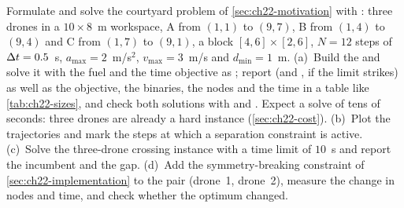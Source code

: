 \begin{exercise}
\label{exr:ch22-coding}
Formulate and solve the courtyard problem of \cref{sec:ch22-motivation}
with : three drones in a $10 \times 8$~m workspace,
A from $(1,1)$ to $(9,7)$, B from $(1,4)$ to $(9,4)$ and C from $(1,7)$ to
$(9,1)$, a block $[4,6] \times [2,6]$, $N = 12$ steps of $\Delta t = 0.5$~s,
$a_{\max} = 2$~m/s$^2$, $v_{\max} = 3$~m/s and $d_{\min} = 1$~m.
(a)~Build the  and solve it with the fuel and the time
objective as ; report
 (and , if the limit strikes) as well as the
objective, the binaries, the nodes and the time in a table like
\cref{tab:ch22-sizes}, and check both solutions with 
and . Expect a solve of tens of seconds: three
drones are already a hard instance (\cref{sec:ch22-cost}).
(b)~Plot the trajectories and mark the steps at which a separation
constraint is active. (c)~Solve the three-drone crossing instance
 with a time limit of $10$~s and report
the incumbent and the gap. (d)~Add the symmetry-breaking constraint of
\cref{sec:ch22-implementation} to the pair (drone~1, drone~2), measure the
change in nodes and time, and check whether the optimum changed.
\end{exercise}

